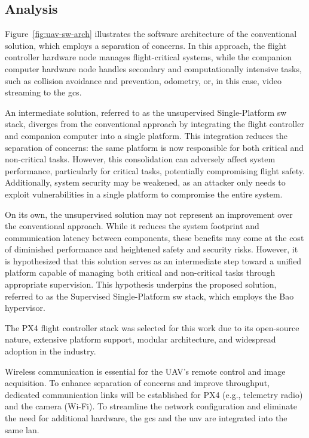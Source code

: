 \subsection{Analysis}
\label{sec:design-analysis}
Figure~\ref{fig:uav-sw-arch} illustrates the software architecture of the conventional solution, which employs a separation of concerns. In this approach, the flight controller hardware node manages flight-critical systems, while the companion computer hardware node handles secondary and computationally intensive tasks, such as collision avoidance and prevention, odometry, or, in this case, video streaming to the \gls{gcs}.

An intermediate solution, referred to as the unsupervised Single-Platform \gls{sw} stack, diverges from the conventional approach by integrating the flight controller and companion computer into a single platform. This integration reduces the separation of concerns: the same platform is now responsible for both critical and non-critical tasks. However, this consolidation can adversely affect system performance, particularly for critical tasks, potentially compromising flight safety. Additionally, system security may be weakened, as an attacker only needs to exploit vulnerabilities in a single platform to compromise the entire system.

On its own, the unsupervised solution may not represent an improvement over the conventional approach. While it reduces the system footprint and communication latency between components, these benefits may come at the cost of diminished performance and heightened safety and security risks. However, it is hypothesized that this solution serves as an intermediate step toward a unified platform capable of managing both critical and non-critical tasks through appropriate supervision. This hypothesis underpins the proposed solution, referred to as the Supervised Single-Platform \gls{sw} stack, which employs the Bao hypervisor.

The PX4 flight controller stack was selected for this work due to its open-source nature, extensive platform support, modular architecture, and widespread adoption in the industry.

Wireless communication is essential for the UAV's remote control and image
acquisition. To enhance separation of concerns and improve throughput, dedicated
communication links will be established for PX4 (e.g., telemetry radio) and the
camera (Wi-Fi). To streamline the network configuration and eliminate the need
for additional hardware, the \gls{gcs} and the \gls{uav} are integrated into the
same \gls{lan}.

